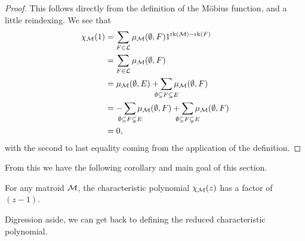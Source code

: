 \documentclass[12pt,oneside]{../../sfsuthesis}
\begin{document}
\begin{proof}
    This follows directly from the definition of the M\"obius function, and a little reindexing.
    We see that
    \begin{align*}
        \chi_\cM(1) & = \sum_{F \in \cL} \mu_\cM(\emptyset, F) 1^{\rk(\cM) - \rk(F)}                                                                                             \\
                    & =  \sum_{F \in \cL} \mu_\cM(\emptyset, F)                                                                                                                  \\
                    & = \mu_\cM(\emptyset, E) +  \sum_{\mathclap{\emptyset \subseteq F \subsetneq E}} \mu_\cM(\emptyset, F)                                                      \\
                    & = -\sum_{\mathclap{\emptyset \subseteq F \subsetneq E}} \mu_\cM(\emptyset, F) + \sum_{\mathclap{\emptyset \subseteq F \subsetneq E}} \mu_\cM(\emptyset, F) \\
                    & = 0,
    \end{align*}
    with the second to last equality coming from the application of the definition.
\end{proof}
From this we have the following corollary and main goal of this section.
\begin{corollary}\th\label{thm:charPolyFactor}
    For any matroid \( \mathcal{M} \), the characteristic polynomial \( \chi_{\mathcal{M}}(z) \) has a factor of \( (z - 1) \).
\end{corollary}
Digression aside, we can get back to defining the reduced characteristic polynomial.
\end{document}
